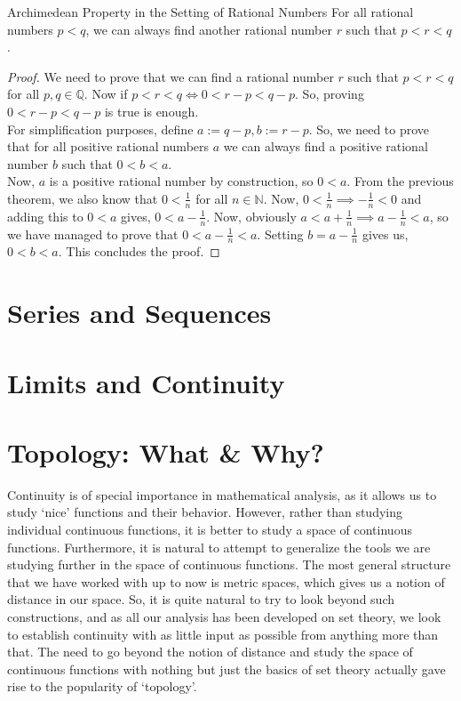\begin{Theorem}{Archimedean Property in the Setting of Rational Numbers}
	For all rational numbers $p<q$, we can always find another rational number $r$ such that $p<r<q$.
\end{Theorem}
\begin{proof}
	We need to prove that we can find a rational number $r$ such that $p<r<q$ for all $p,q\in\mathbb{Q}$. Now if $p<r<q\iff 0<r-p<q-p$. So, proving $0<r-p<q-p$ is true is enough.\\
	For simplification purposes, define $a:=q-p,b:=r-p$. So, we need to prove that for all positive rational numbers $a$ we can always find a positive rational number $b$ such that $0<b<a$.\\
	Now, $a$ is a positive rational number by construction, so $0<a$. From the previous theorem, we also know that $0<\frac{1}{n}$ for all $n\in\mathbb{N}$. Now, $0<\frac{1}{n}\implies-\frac{1}{n}<0$ and adding this to $0<a$ gives, $0<a-\frac{1}{n}$. Now, obviously $a<a+\frac{1}{n}\implies a-\frac{1}{n}<a$, so we have managed to prove that $0<a-\frac{1}{n}<a$. Setting $b=a-\frac{1}{n}$ gives us, $0<b<a$. This concludes the proof.
\end{proof}
\chapter{Series and Sequences}
\chapter{Limits and Continuity}
\chapter{Topology: What \& Why?}
Continuity is of special importance in mathematical analysis, as it allows us to study `nice' functions and their behavior. However, rather than studying individual continuous functions, it is better to study a space of continuous functions. Furthermore, it is natural to attempt to generalize the tools we are studying further in the space of continuous functions. The most general structure that we have worked with up to now is metric spaces, which gives us a notion of distance in our space. So, it is quite natural to try to look beyond such constructions, and as all our analysis has been developed on set theory, we look to establish continuity with as little input as possible from anything more than that. The need to go beyond the notion of distance and study the space of continuous functions with nothing but just the basics of set theory actually gave rise to the popularity of `topology'.
